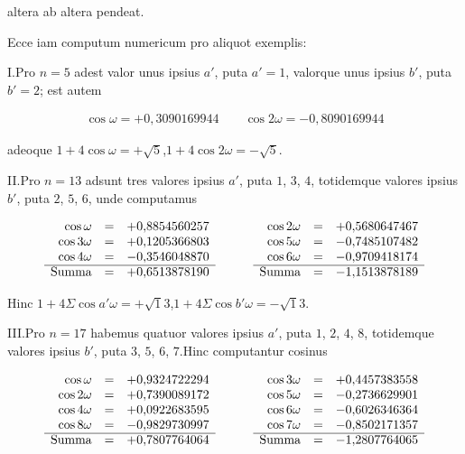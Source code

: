 altera ab altera pendeat.


Ecce iam computum numericum pro aliquot exemplis:

I.\quad Pro $n=5$ adest valor unus ipsius $a'$, puta $a'=1$, valorque unus ipsius $b'$, puta $b'=2$; est autem

\[
\begin{aligned}
\cos\omega=+0{,}3090169944\qquad\cos2\omega=-0{,}8090169944
\end{aligned}
\]

adeoque $1+4\cos\omega=+\surd5$,\quad $1+4\cos2\omega=-\surd5$.

II.\quad Pro $n=13$ adsunt tres valores ipsius $a'$, puta $1$, $3$, $4$, totidemque valores ipsius $b'$, puta $2$, $5$, $6$, unde computamus

{\small\setlength{\arraycolsep}{2.5pt}\renewcommand{\arraystretch}{1.15}
\[
\begin{array}{rclcrcl}
\cos\omega&=&+0{,}8854560257&\qquad&\cos2\omega&=&+0{,}5680647467\\
\cos3\omega&=&+0{,}1205366803&\qquad&\cos5\omega&=&-0{,}7485107482\\
\cos4\omega&=&-0{,}3546048870&\qquad&\cos6\omega&=&-0{,}9709418174\\\cline{1-3}\cline{5-7}
\text{Summa}&=&+0{,}6513878190&\qquad&\text{Summa}&=&-1{,}1513878189
\end{array}
\]
}

Hinc $1+4\Sigma\cos a'\omega=+\surd13$,\quad $1+4\Sigma\cos b'\omega=-\surd13$.

III.\quad Pro $n=17$ habemus quatuor valores ipsius $a'$, puta $1$, $2$, $4$, $8$, totidemque valores ipsius $b'$, puta $3$, $5$, $6$, $7$.\quad Hinc computantur cosinus

{\small\setlength{\arraycolsep}{2.5pt}\renewcommand{\arraystretch}{1.15}
\[
\begin{array}{rclcrcl}
\cos\omega&=&+0{,}9324722294&\qquad&\cos3\omega&=&+0{,}4457383558\\
\cos2\omega&=&+0{,}7390089172&\qquad&\cos5\omega&=&-0{,}2736629901\\
\cos4\omega&=&+0{,}0922683595&\qquad&\cos6\omega&=&-0{,}6026346364\\
\cos8\omega&=&-0{,}9829730997&\qquad&\cos7\omega&=&-0{,}8502171357\\\cline{1-3}\cline{5-7}
\text{Summa}&=&+0{,}7807764064&\qquad&\text{Summa}&=&-1{,}2807764065
\end{array}
\]
}

